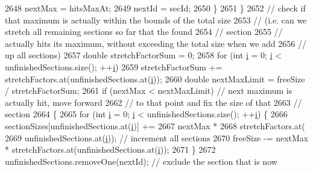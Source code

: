 \begin{DoxyCode}
2648           nextMax = hitsMaxAt;
2649           nextId = secId;
2650         \}
2651       \}
2652       \textcolor{comment}{// check if that maximum is actually within the bounds of the total size}
2653       \textcolor{comment}{// (i.e. can we stretch all remaining sections so far that the found}
2654       \textcolor{comment}{// section}
2655       \textcolor{comment}{// actually hits its maximum, without exceeding the total size when we add}
2656       \textcolor{comment}{// up all sections)}
2657       \textcolor{keywordtype}{double} stretchFactorSum = 0;
2658       \textcolor{keywordflow}{for} (\textcolor{keywordtype}{int} \hyperlink{_comparision_pictures_2_createtest_image_8m_a6f6ccfcf58b31cb6412107d9d5281426}{i} = 0; \hyperlink{_comparision_pictures_2_createtest_image_8m_a6f6ccfcf58b31cb6412107d9d5281426}{i} < unfinishedSections.size(); ++\hyperlink{_comparision_pictures_2_createtest_image_8m_a6f6ccfcf58b31cb6412107d9d5281426}{i})
2659         stretchFactorSum += stretchFactors.at(unfinishedSections.at(\hyperlink{_comparision_pictures_2_createtest_image_8m_a6f6ccfcf58b31cb6412107d9d5281426}{i}));
2660       \textcolor{keywordtype}{double} nextMaxLimit = freeSize / stretchFactorSum;
2661       \textcolor{keywordflow}{if} (nextMax < nextMaxLimit) \textcolor{comment}{// next maximum is actually hit, move forward}
2662                                   \textcolor{comment}{// to that point and fix the size of that}
2663                                   \textcolor{comment}{// section}
2664       \{
2665         \textcolor{keywordflow}{for} (\textcolor{keywordtype}{int} \hyperlink{_comparision_pictures_2_createtest_image_8m_a6f6ccfcf58b31cb6412107d9d5281426}{i} = 0; \hyperlink{_comparision_pictures_2_createtest_image_8m_a6f6ccfcf58b31cb6412107d9d5281426}{i} < unfinishedSections.size(); ++\hyperlink{_comparision_pictures_2_createtest_image_8m_a6f6ccfcf58b31cb6412107d9d5281426}{i}) \{
2666           sectionSizes[unfinishedSections.at(\hyperlink{_comparision_pictures_2_createtest_image_8m_a6f6ccfcf58b31cb6412107d9d5281426}{i})] +=
2667               nextMax *
2668               stretchFactors.at(
2669                   unfinishedSections.at(\hyperlink{_comparision_pictures_2_createtest_image_8m_a6f6ccfcf58b31cb6412107d9d5281426}{i})); \textcolor{comment}{// increment all sections}
2670           freeSize -= nextMax * stretchFactors.at(unfinishedSections.at(\hyperlink{_comparision_pictures_2_createtest_image_8m_a6f6ccfcf58b31cb6412107d9d5281426}{i}));
2671         \}
2672         unfinishedSections.removeOne(nextId); \textcolor{comment}{// exclude the section that is now}

\end{DoxyCode}

